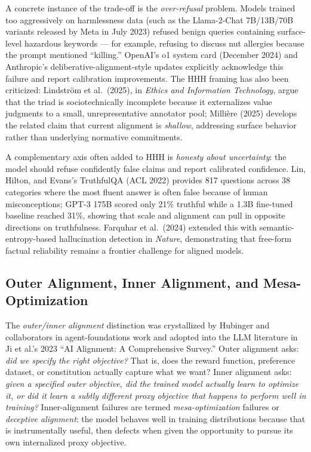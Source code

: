 A concrete instance of the trade-off is the \emph{over-refusal} problem. Models trained too aggressively on harmlessness data (such as the Llama-2-Chat 7B/13B/70B variants released by Meta in July 2023) refused benign queries containing surface-level hazardous keywords --- for example, refusing to discuss nut allergies because the prompt mentioned ``killing.'' OpenAI's o1 system card (December 2024) and Anthropic's deliberative-alignment-style updates explicitly acknowledge this failure and report calibration improvements. The HHH framing has also been criticized: Lindström et al.~(2025), in \emph{Ethics and Information Technology}, argue that the triad is sociotechnically incomplete because it externalizes value judgments to a small, unrepresentative annotator pool; Millière (2025) develops the related claim that current alignment is \emph{shallow}, addressing surface behavior rather than underlying normative commitments.

A complementary axis often added to HHH is \emph{honesty about uncertainty}: the model should refuse confidently false claims and report calibrated confidence. Lin, Hilton, and Evans's TruthfulQA (ACL 2022) provides 817 questions across 38 categories where the most fluent answer is often false because of human misconceptions; GPT-3 175B scored only 21\% truthful while a 1.3B fine-tuned baseline reached 31\%, showing that scale and alignment can pull in opposite directions on truthfulness. Farquhar et al.~(2024) extended this with semantic-entropy-based hallucination detection in \emph{Nature}, demonstrating that free-form factual reliability remains a frontier challenge for aligned models.

\subsection{Outer Alignment, Inner Alignment, and Mesa-Optimization}\label{outer-alignment-inner-alignment-and-mesa-optimization}

The \emph{outer/inner alignment} distinction was crystallized by Hubinger and collaborators in agent-foundations work and adopted into the LLM literature in Ji et al.'s 2023 ``AI Alignment: A Comprehensive Survey.'' Outer alignment asks: \emph{did we specify the right objective?} That is, does the reward function, preference dataset, or constitution actually capture what we want? Inner alignment asks: \emph{given a specified outer objective, did the trained model actually learn to optimize it, or did it learn a subtly different proxy objective that happens to perform well in training?} Inner-alignment failures are termed \emph{mesa-optimization} failures or \emph{deceptive alignment}: the model behaves well in training distributions because that is instrumentally useful, then defects when given the opportunity to pursue its own internalized proxy objective.


